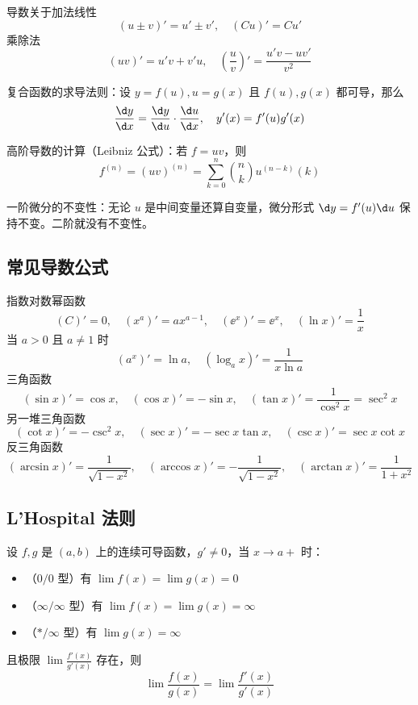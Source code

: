 导数关于加法线性
\[ (u \pm v)' = u' \pm v', \quad  (Cu)' = Cu' \]
乘除法
\[ (uv)' = u'v + v'u, \quad \left(\frac{u}{v}\right)' = \frac{u'v - uv'}{v^2} \]

复合函数的求导法则：设 $y = f(u), u = g(x)$ 且 $f(u), g(x)$ 都可导，那么
\[ \frac{\d y}{\d x} = \frac{\d y}{\d u} \cdot \frac{\d u}{\d x}, \quad y'(x) = f'(u) g'(x) \]

高阶导数的计算（Leibniz 公式）：若 $f = uv$，则
\[ f^{(n)} = (uv)^{(n)} = \sum_{k=0}^{n} \binom{n}{k} u^{(n-k)}{(k)} \]

一阶微分的不变性：无论 $u$ 是中间变量还算自变量，微分形式 $\d y = f'(u) \d u$ 保持不变。二阶就没有不变性。

\subsection{常见导数公式}

指数对数幂函数
\[  (C)' = 0, \quad \left(x^a\right)' = a x^{a-1}, \quad
	\left(\ee^x\right)' = \ee^x, \quad
	\left(\ln x\right)' = \frac{1}{x} \]
当 $a > 0$ 且 $a \neq 1$ 时
\[ \left(a^x\right)' = \ln a, \quad \left(\log_a x\right)' = \frac{1}{x \ln a}  \]
三角函数
\[ \left(\sin x\right)' = \cos x, \quad \left(\cos x\right)' = -\sin x, \quad \left(\tan x\right)' = \frac{1}{\cos^2 x} = \sec^2 x \]
另一堆三角函数
\[ \left(\cot x\right)' = -\csc^2 x, \quad \left(\sec x\right)' = -\sec x\tan x, \quad \left(\csc x\right)' = \sec x \cot x \]
反三角函数
\[
	\left(\arcsin x\right)' = \frac{1}{\sqrt{1-x^2}} , \quad
	\left(\arccos x\right)' = -\frac{1}{\sqrt{1-x^2}}, \quad
	\left(\arctan x\right)' = \frac{1}{1+x^2}
\]

\subsection{L'Hospital 法则}

\begin{theorem}[L'Hospital 法则]
	设 $f,g$ 是 $(a,b)$ 上的连续可导函数，$g' \neq 0$，当 $x \to a+$ 时：
	\begin{itemize}
		\item （$0/0$ 型）有 $\lim f(x) = \lim g(x) = 0$
		\item （$\infty/\infty$ 型）有 $\lim f(x) = \lim g(x) = \infty$
		\item （$\ast/\infty$ 型）有 $\lim g(x) = \infty$
	\end{itemize}
	且极限 $\lim \frac{f'(x)}{g'(x)}$ 存在，则
	\[ \lim \frac{f(x)}{g(x)} = \lim \frac{f'(x)}{g'(x)} \]
\end{theorem}

